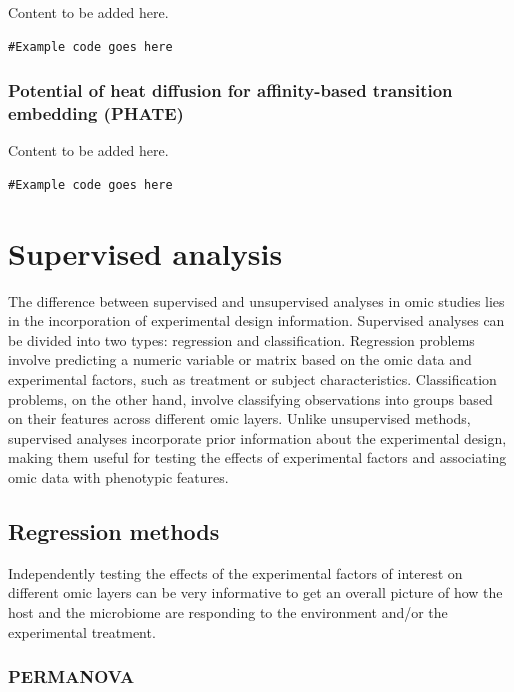 \documentclass[
]{book}
\begin{document}
Content to be added here.

\begin{verbatim}
#Example code goes here
\end{verbatim}

\hypertarget{phate}{%
\subsection{Potential of heat diffusion for affinity-based transition embedding (PHATE)}\label{phate}}

Content to be added here.

\begin{verbatim}
#Example code goes here
\end{verbatim}

\hypertarget{supervised-analysis}{%
\chapter{Supervised analysis}\label{supervised-analysis}}

The difference between supervised and unsupervised analyses in omic studies lies in the incorporation of experimental design information. Supervised analyses can be divided into two types: regression and classification. Regression problems involve predicting a numeric variable or matrix based on the omic data and experimental factors, such as treatment or subject characteristics. Classification problems, on the other hand, involve classifying observations into groups based on their features across different omic layers. Unlike unsupervised methods, supervised analyses incorporate prior information about the experimental design, making them useful for testing the effects of experimental factors and associating omic data with phenotypic features.

\hypertarget{regression-methods}{%
\section{Regression methods}\label{regression-methods}}

Independently testing the effects of the experimental factors of interest on different omic layers can be very informative to get an overall picture of how the host and the microbiome are responding to the environment and/or the experimental treatment.

\hypertarget{permanova}{%
\subsection{PERMANOVA}\label{permanova}}
\end{document}
